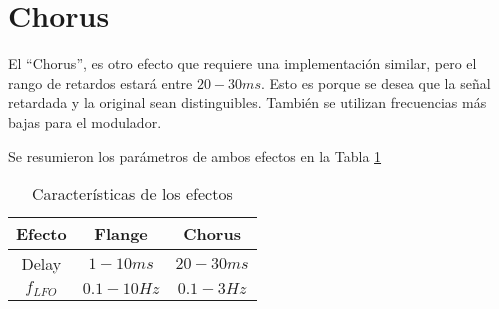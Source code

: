 \section{Chorus}

El ``Chorus'', es otro efecto que requiere una implementación similar, pero el rango de retardos estará entre $20-30 ms$. Esto es porque se desea que la señal retardada y la original sean distinguibles. También se utilizan frecuencias más bajas para el modulador.

Se resumieron los parámetros de ambos efectos en la Tabla \ref{tab:effects}

\begin{table}[ht]
    \begin{center}
        \begin{tabular}{|c|c|c|}
            \hline
            Efecto      &   Flange          &   Chorus      \\
            \hline
            Delay       &   $1-10 ms$       &   $20-30 ms$   \\
            $f_{LFO}$   &   $0.1 - 10 Hz$   &   $0.1-3Hz$  \\
            \hline
        \end{tabular}
        \caption{Características de los efectos}
        \label{tab:effects}
    \end{center}
\end{table}